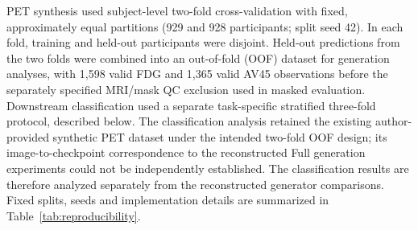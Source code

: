 PET synthesis used subject-level two-fold cross-validation with fixed, approximately equal partitions (929 and 928 participants; split seed 42). In each fold, training and held-out participants were disjoint. Held-out predictions from the two folds were combined into an out-of-fold (OOF) dataset for generation analyses, with 1,598 valid FDG and 1,365 valid AV45 observations before the separately specified MRI/mask QC exclusion used in masked evaluation. Downstream classification used a separate task-specific stratified three-fold protocol, described below. The classification analysis retained the existing author-provided synthetic PET dataset under the intended two-fold OOF design; its image-to-checkpoint correspondence to the reconstructed Full generation experiments could not be independently established. The classification results are therefore analyzed separately from the reconstructed generator comparisons. Fixed splits, seeds and implementation details are summarized in Table~\ref{tab:reproducibility}.
